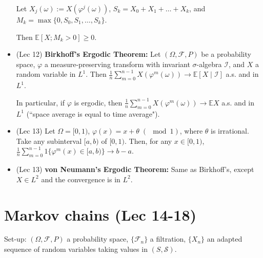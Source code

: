 \documentclass[twoside]{article}
\newcommand{\dis}{\displaystyle}
\newcommand\bbE{\mathbb{E}}
\newcommand\calF{\mathcal{F}}
\newcommand\calS{\mathcal{S}}
\newcommand\om{\omega}
\newcommand\Om{\Omega}
\newcommand\sg{\sigma}
\def\t{\theta}
\newcommand\vp{\varphi}
\newcommand\goesto{\rightarrow}
\begin{document}
\begin{itemize}
Let $X_j(\om) := X(\vp^j (\om))$, $S_k = X_0 + X_1 + \dots + X_k$, and $M_k = \max \{ 0, S_0, S_1, \dots, S_k\}$.

Then $\bbE [X; M_k > 0] \geq 0$.

\item (Lec 12) \textbf{Birkhoff's Ergodic Theorem:} Let $(\Om, \calF, P)$ be a probability space, $\vp$ a measure-preserving transform with invariant $\sg$-algebra $\mathcal{I}$, and $X$ a random variable in $L^1$. Then $\dis\frac{1}{n} \sum_{m=0}^{n-1} X(\vp^m (\om)) \goesto \bbE [X \mid \mathcal{I}]$ a.s. and in $L^1$.

In particular, if $\vp$ is ergodic, then $\dis\frac{1}{n} \sum_{m=0}^{n-1} X(\vp^m (\om)) \goesto \bbE X$ a.s. and in $L^1$ (``space average is equal to time average").

\item (Lec 13) Let $\Om = [0, 1)$, $\vp(x) = x + \t \;(\mod 1)$, where $\t$ is irrational. Take any subinterval $[a,b)$ of $[0, 1)$. Then, for any $x \in [0, 1)$, $\dis\frac{1}{n}\sum_{m = 0}^{n-1} 1 \{ \vp^m (x) \in [a, b) \} \goesto b - a$.

\item (Lec 13) \textbf{von Neumann's Ergodic Theorem:} Same as Birkhoff's, except $X \in L^2$ and the convergence is in $L^2$.

\end{itemize}

\section*{Markov chains (Lec 14-18)}
Set-up: $(\Om, \calF, P)$ a probability space, $\{\calF_n\}$ a filtration, $\{X_n\}$ an adapted sequence of random variables taking values in $(S, \calS)$.
\end{document}
